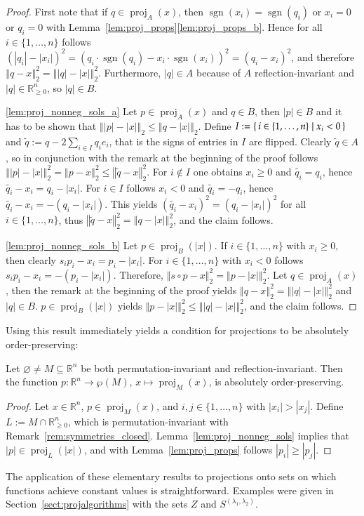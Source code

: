 \documentclass[twoside,11pt]{article}
\DeclareMathOperator{\proj}{proj}
\DeclareMathOperator{\sgn}{sgn}
\DeclareMathOperator{\hada}{\circ}
\newcommand{\R}{\mathbb{R}}
\newcommand{\0}{\mathcal{O}}
\newcommand{\norm}[1]{\left\Vert#1\right\Vert}
\newcommand{\abs}[1]{\left\vert #1 \right\vert}
\newcommand{\discint}[2]{\{#1,\dotsc,#2\}}
\newcommand{\inint}[2]{\in\discint{#1}{#2}}
\renewcommand{\P}{\wp}
\renewcommand{\emptyset}{\varnothing}
\begin{document}
\begin{proof}
First note that if $q\in\proj_A(x)$, then $\sgn(x_i) = \sgn(q_i)$ or $x_i = 0$ or $q_i = 0$ with Lemma~\ref{lem:proj_props}\ref{lem:proj_props_b}.
Hence for all $i\inint{1}{n}$ follows $\left(\abs{q_i} - \abs{x_i}\right)^2 = \left(q_i\cdot\sgn(q_i) - x_i\cdot\sgn(x_i)\right)^2 = \left(q_i - x_i\right)^2$, and therefore $\norm{q - x}_2^2 = \norm{\abs{q} - \abs{x}}_2^2$.
Furthermore, $\abs{q}\in A$ because of $A$ reflection-invariant and $\abs{q}\in\R_{\geq 0}^n$, so $\abs{q}\in B$.

\ref{lem:proj_nonneg_sols_a}
Let $p\in\proj_A(x)$ and $q\in B$, then $\abs{p}\in B$ and it has to be shown that $\norm{\abs{p} - \abs{x}}_2 \leq \norm{q - \abs{x}}_2$.
Define $I := \set{i\inint{1}{n} | x_i < 0}$ and $\tilde{q} := q - 2\sum_{i\in I}q_i e_i$, that is the signs of entries in $I$ are flipped.
Clearly $\tilde{q}\in A$, so in conjunction with the remark at the beginning of the proof follows $\norm{\abs{p} - \abs{x}}_2^2 = \norm{p - x}_2^2 \leq \norm{\tilde{q} - x}_2^2$.
For $i\not\in I$ one obtains $x_i\geq 0$ and $\tilde{q_i} = q_i$, hence $\tilde{q_i} - x_i = q_i - \abs{x_i}$.
For $i\in I$ follows $x_i < 0$ and $\tilde{q_i} = -q_i$, hence $\tilde{q_i} - x_i = -\left(q_i - \abs{x_i}\right)$.
This yields $\left(\tilde{q_i} - x_i\right)^2 = \left(q_i - \abs{x_i}\right)^2$ for all $i\inint{1}{n}$, thus $\norm{\tilde{q} - x}_2^2 = \norm{q - \abs{x}}_2^2$, and the claim follows.

\ref{lem:proj_nonneg_sols_b}
Let $p\in\proj_B(\abs{x})$.
If $i\inint{1}{n}$ with $x_i\geq 0$, then clearly $s_ip_i - x_i = p_i - \abs{x_i}$.
For $i\inint{1}{n}$ with $x_i < 0$ follows $s_ip_i - x_i = -\left(p_i - \abs{x_i}\right)$.
Therefore, $\norm{s\hada p - x}_2^2 = \norm{p - \abs{x}}_2^2$.
Let $q\in\proj_A(x)$, then the remark at the beginning of the proof yields $\norm{q - x}_2^2 = \norm{\abs{q} - \abs{x}}_2^2$ and $\abs{q}\in B$.
$p\in\proj_B(\abs{x})$ yields $\norm{p - \abs{x}}_2^2 \leq \norm{\abs{q} - \abs{x}}_2^2$, and the claim follows.
\end{proof}
Using this result immediately yields a condition for projections to be absolutely order-preserving:
\begin{lemma}
Let $\emptyset\neq M\subseteq\R^n$ be both permutation-invariant and reflection-invariant.
Then the function $p\colon\R^n\to\P(M)$, $x\mapsto\proj_M(x)$, is absolutely order-preserving.
\end{lemma}
\begin{proof}
Let $x\in\R^n$, $p\in\proj_M(x)$, and $i,j\inint{1}{n}$ with $\abs{x_i} > \abs{x_j}$.
Define $L := M\cap\R_{\geq 0}^n$, which is permutation-invariant with Remark~\ref{rem:symmetries_closed}.
Lemma~\ref{lem:proj_nonneg_sols} implies that $\abs{p}\in\proj_L(\abs{x})$, and with Lemma~\ref{lem:proj_props} follows $\abs{p_i}\geq\abs{p_j}$.
\end{proof}
The application of these elementary results to projections onto sets on which functions achieve constant values is straightforward.
Examples were given in Section~\ref{sect:projalgorithms} with the sets $Z$ and $S^{(\lambda_1,\lambda_2)}$.
\end{document}
